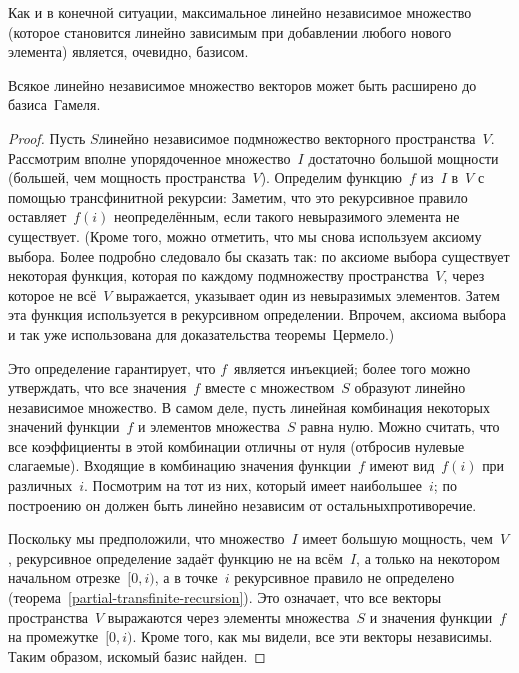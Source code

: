 Как и в конечной ситуации, максимальное линейно независимое
множество (которое становится линейно зависимым при добавлении
любого нового элемента) является, очевидно, базисом.

\begin{theorem}
        \label{hamel-base-existence}
Всякое линейно независимое множество векторов
может быть расширено до базиса~Гамеля.
\end{theorem}

\begin{proof}
Пусть $S$\т линейно независимое подмножество векторного
пространства~$V$. Рассмотрим вполне упорядоченное множество~$I$
достаточно большой мощности (большей, чем мощность
пространства~$V$). Определим функцию~$f$ из~$I$ в~$V$ с помощью
трансфинитной рекурсии:
\noindent
Заметим, что это рекурсивное правило оставляет~$f(i)$
неопределённым, если такого невыразимого элемента не существует.
(Кроме того, можно отметить, что мы снова используем аксиому
выбора. Более подробно следовало бы сказать так: по аксиоме
выбора существует некоторая функция, которая по каждому
подмножеству пространства~$V$, через которое не всё~$V$
выражается, указывает один из невыразимых элементов. Затем эта
функция используется в рекурсивном определении. Впрочем, аксиома
выбора и так уже использована для доказательства теоремы~Цермело.)

Это определение гарантирует, что $f$~является
инъекцией; более того можно утверждать, что все значения~$f$
вместе с множеством~$S$
образуют линейно независимое множество. В самом деле, пусть
линейная комбинация некоторых значений функции~$f$ и элементов множества~$S$
равна нулю.
Можно считать, что все коэффициенты в этой комбинации отличны от
нуля (отбросив нулевые слагаемые). Входящие в комбинацию значения функции~$f$
имеют вид~$f(i)$ при различных~$i$. Посмотрим на тот из них,
который имеет наибольшее~$i$; по построению он должен быть
линейно независим от остальных\т противоречие.

Поскольку мы предположили, что множество~$I$ имеет большую
мощность, чем~$V$, рекурсивное определение
задаёт функцию не на всём~$I$, а только на некотором начальном
отрезке~$[0,i)$, а в точке~$i$ рекурсивное правило не определено
(теорема~\ref{partial-transfinite-recursion}). Это означает, что
все векторы пространства~$V$ выражаются через элементы множества~$S$
и значения
функции~$f$ на промежутке~$[0,i)$. Кроме того, как мы видели, все эти
векторы независимы. Таким образом, искомый базис найден.
\end{proof}


